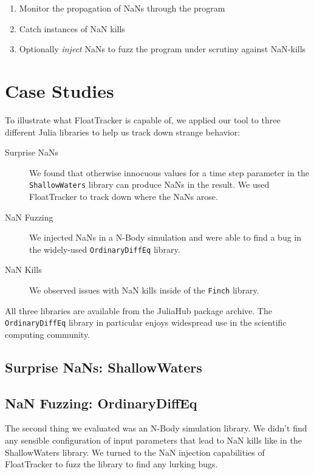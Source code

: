 \documentclass{juliacon}
\begin{document}
\begin{enumerate}
  \item Monitor the propagation of NaNs through the program
  \item Catch instances of NaN kills
  \item Optionally \emph{inject} NaNs to fuzz the program under scrutiny against NaN-kills
\end{enumerate}

%

\section{Case Studies}

To illustrate what FloatTracker is capable of, we applied our tool to three different Julia libraries to help us track down strange behavior:

\begin{description}
\item[Surprise NaNs] We found that otherwise innocuous values for a time step parameter in the \texttt{ShallowWaters} library can produce NaNs in the result.
  We used FloatTracker to track down where the NaNs arose.
\item[NaN Fuzzing] We injected NaNs in a N-Body simulation and were able to find a bug in the widely-used \texttt{OrdinaryDiffEq} library.
\item[NaN Kills] We observed issues with NaN kills inside of the \texttt{Finch} library.
\end{description}

All three libraries are available from the JuliaHub package archive.
The \texttt{OrdinaryDiffEq} library in particular enjoys widespread use in the scientific computing community.

\subsection{Surprise NaNs: ShallowWaters}

\subsection{NaN Fuzzing: OrdinaryDiffEq}

The second thing we evaluated was an N-Body simulation library.
We didn't find any sensible configuration of input parameters that lead to NaN kills like in the ShallowWaters library.
We turned to the NaN injection capabilities of FloatTracker to fuzz the library to find any lurking bugs.
\end{document}
